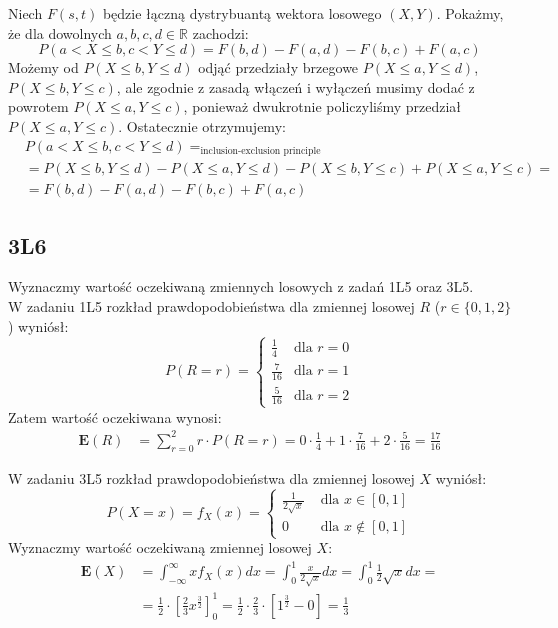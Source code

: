 \documentclass{article}
\begin{document}
Niech $F(s,t)$ będzie łączną dystrybuantą wektora losowego $(X,Y)$. Pokażmy, że dla dowolnych $a,b,c,d\in\mathbb{R}$ zachodzi:
\[
    P(a<X\leq b, c<Y\leq d) = F(b,d) - F(a,d) - F(b,c) + F(a,c)
\]
\noindent
Możemy od $P(X\leq b, Y\leq d)$ odjąć przedziały brzegowe $P(X\leq a, Y\leq d)$, $P(X\leq b, Y\leq c)$, ale zgodnie z zasadą włączeń i wyłączeń
musimy dodać z powrotem $P(X\leq a, Y\leq c)$, ponieważ dwukrotnie policzyliśmy przedział $P(X\leq a, Y\leq c)$. Ostatecznie otrzymujemy:
\setcounter{equation}{0}
\begin{align}
    &P(a<X\leq b, c<Y\leq d) =_{\text{inclusion-exclusion principle}} \\
    &= P(X\leq b, Y\leq d) - P(X\leq a, Y\leq d) - P(X\leq b, Y\leq c) + P(X\leq a, Y\leq c) = \\
    &= F(b,d) - F(a,d) - F(b,c) + F(a,c)
\end{align}

\subsection{3L6}

Wyznaczmy wartość oczekiwaną zmiennych losowych z zadań 1L5 oraz 3L5.\\

\noindent
W zadaniu 1L5 rozkład prawdopodobieństwa dla zmiennej losowej $R$ ($r\in\{0,1,2\}$) wyniósł:
\[
    P(R=r) = \begin{cases}
        \frac{1}{4} & \text{dla } r=0 \\
        \frac{7}{16} & \text{dla } r=1 \\
        \frac{5}{16} & \text{dla } r=2
    \end{cases}
\]
Zatem wartość oczekiwana wynosi:
\setcounter{equation}{0}
\begin{align}
    \mathbf{E}(R) &= \sum_{r=0}^{2} r\cdot P(R=r) 
    = 0\cdot \frac{1}{4} + 1\cdot \frac{7}{16} + 2\cdot \frac{5}{16} = \frac{17}{16}
\end{align}

\noindent
W zadaniu 3L5 rozkład prawdopodobieństwa dla zmiennej losowej $X$ wyniósł:
\[
    P(X=x) = f_X(x) = \begin{cases}
        \frac{1}{2\sqrt{x}} &\text { dla } x\in[0,1]\\
        0 &\text{ dla } x\notin[0,1]
    \end{cases} 
\]
Wyznaczmy wartość oczekiwaną zmiennej losowej $X$:
\begin{align}
    \mathbf{E}(X) 
    &= \int_{-\infty}^{\infty} x f_X(x) dx
    = \int_{0}^{1} \frac{x}{2\sqrt{x}} dx
    = \int_{0}^{1} \frac{1}{2}\sqrt{x} dx =\\
    &= \frac{1}{2} \cdot \left[\frac{2}{3} x^{\frac{3}{2}}\right]_{0}^{1}
    = \frac{1}{2} \cdot \frac{2}{3}  \cdot \left[1^{\frac{3}{2}} - 0\right]
    = \frac{1}{3}
\end{align}
\end{document}
